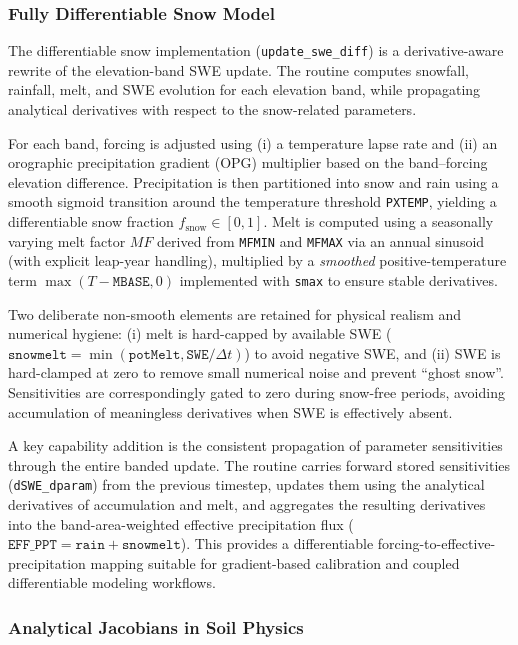 \documentclass[11pt]{scrartcl}
\begin{document}
\subsubsection{Fully Differentiable Snow Model}

The differentiable snow implementation (\texttt{update\_swe\_diff}) is a derivative-aware
rewrite of the elevation-band SWE update.
The routine computes snowfall, rainfall, melt, and SWE evolution for each elevation band,
while propagating analytical derivatives with respect to the snow-related parameters.

For each band, forcing is adjusted using (i) a temperature lapse rate and (ii) an orographic
precipitation gradient (OPG) multiplier based on the band--forcing elevation difference.
Precipitation is then partitioned into snow and rain using a smooth sigmoid transition
around the temperature threshold \texttt{PXTEMP}, yielding a differentiable snow fraction
\(f_{\text{snow}}\in[0,1]\). Melt is computed using a seasonally varying melt factor
\(MF\) derived from \texttt{MFMIN} and \texttt{MFMAX} via an annual sinusoid (with explicit
leap-year handling), multiplied by a \emph{smoothed} positive-temperature term
\(\max(T - \texttt{MBASE},0)\) implemented with \texttt{smax} to ensure stable derivatives.

Two deliberate non-smooth elements are retained for physical realism and numerical hygiene:
(i) melt is hard-capped by available SWE (\(\texttt{snowmelt}=\min(\texttt{potMelt},\texttt{SWE}/\Delta t)\))
to avoid negative SWE, and (ii) SWE is hard-clamped at zero to remove small numerical noise
and prevent ``ghost snow''. Sensitivities are correspondingly gated to zero during snow-free
periods, avoiding accumulation of meaningless derivatives when SWE is effectively absent.

A key capability addition is the consistent propagation of parameter sensitivities through
the entire banded update. The routine carries forward stored sensitivities
(\texttt{dSWE\_dparam}) from the previous timestep, updates them using the analytical
derivatives of accumulation and melt, and aggregates the resulting derivatives into the
band-area-weighted effective precipitation flux (\(\texttt{EFF\_PPT} = \texttt{rain} + \texttt{snowmelt}\)).
This provides a differentiable forcing-to-effective-precipitation mapping suitable for
gradient-based calibration and coupled differentiable modeling workflows.


\subsubsection{Analytical Jacobians in Soil Physics}
\end{document}
